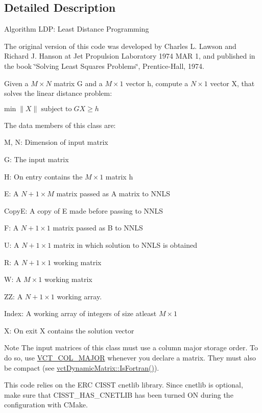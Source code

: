 \subsection{Detailed Description}
Algorithm L\+D\+P\+: Least Distance Programming

The original version of this code was developed by Charles L. Lawson and Richard J. Hanson at Jet Propulsion Laboratory 1974 M\+A\+R 1, and published in the book \char`\"{}\+Solving Least Squares Problems\char`\"{}, Prentice-\/\+Hall, 1974.

Given a $ M \times N $ matrix G and a $ M \times 1 $ vector h, compute a $ N \times 1 $ vector X, that solves the linear distance problem\+:

$ \mbox{min} \; \| X \| \; \mbox{subject to} \; GX \geq h $

The data members of this class are\+:
\begin{DoxyItemize}
\item M, N\+: Dimension of input matrix
\item G\+: The input matrix
\item H\+: On entry contains the $ M \times 1 $ matrix h
\item E\+: A $ N+1 \times M $ matrix passed as A matrix to N\+N\+L\+S
\item Copy\+E\+: A copy of E made before passing to N\+N\+L\+S
\item F\+: A $ N+1 \times 1 $ matrix passed as B to N\+N\+L\+S
\item U\+: A $ N+1 \times 1 $ matrix in which solution to N\+N\+L\+S is obtained
\item R\+: A $ N+1 \times 1 $ working matrix
\item W\+: A $ M \times 1 $ working matrix
\item Z\+Z\+: A $ N+1 \times 1 $ working array.
\item Index\+: A working array of integers of size atleast $ M \times 1 $
\item X\+: On exit X contains the solution vector
\end{DoxyItemize}

\begin{DoxyNote}{Note}
The input matrices of this class must use a column major storage order. To do so, use \hyperlink{vct_forward_declarations_8h_a432cdf8923afaf82f551450ad4034746}{V\+C\+T\+\_\+\+C\+O\+L\+\_\+\+M\+A\+J\+O\+R} whenever you declare a matrix. They must also be compact (see \hyperlink{classvct_dynamic_const_matrix_base_aac5f19015b4888f760f99daa4bac199c}{vct\+Dynamic\+Matrix\+::\+Is\+Fortran()}).

This code relies on the E\+R\+C C\+I\+S\+S\+T cnetlib library. Since cnetlib is optional, make sure that C\+I\+S\+S\+T\+\_\+\+H\+A\+S\+\_\+\+C\+N\+E\+T\+L\+I\+B has been turned O\+N during the configuration with C\+Make. 
\end{DoxyNote}


